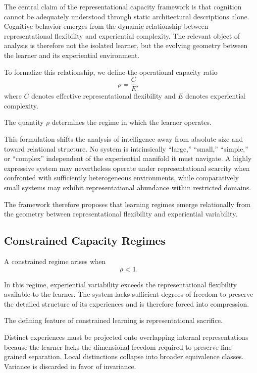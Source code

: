 \documentclass[12pt,a4paper]{article}
\begin{document}
The central claim of the representational capacity framework is that cognition cannot be adequately understood through static architectural descriptions alone. Cognitive behavior emerges from the dynamic relationship between representational flexibility and experiential complexity. The relevant object of analysis is therefore not the isolated learner, but the evolving geometry between the learner and its experiential environment.

To formalize this relationship, we define the operational capacity ratio
\[
\rho = \frac{C}{E},
\]
where \(C\) denotes effective representational flexibility and \(E\) denotes experiential complexity.

The quantity \(\rho\) determines the regime in which the learner operates.

This formulation shifts the analysis of intelligence away from absolute size and toward relational structure. No system is intrinsically “large,” “small,” “simple,” or “complex” independent of the experiential manifold it must navigate. A highly expressive system may nevertheless operate under representational scarcity when confronted with sufficiently heterogeneous environments, while comparatively small systems may exhibit representational abundance within restricted domains.

The framework therefore proposes that learning regimes emerge relationally from the geometry between representational flexibility and experiential variability.

\subsection{Constrained Capacity Regimes}

A constrained regime arises when
\[
\rho < 1.
\]

In this regime, experiential variability exceeds the representational flexibility available to the learner. The system lacks sufficient degrees of freedom to preserve the detailed structure of its experiences and is therefore forced into compression.

The defining feature of constrained learning is representational sacrifice.

Distinct experiences must be projected onto overlapping internal representations because the learner lacks the dimensional freedom required to preserve fine-grained separation. Local distinctions collapse into broader equivalence classes. Variance is discarded in favor of invariance.
\end{document}
